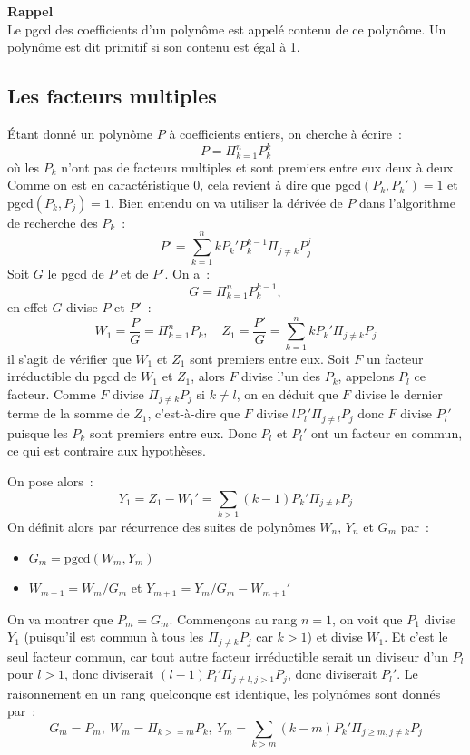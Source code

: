 \documentclass[a4paper,11pt]{article}
\begin{document}
\begin{giacjshere}
{\bf Rappel}\\
Le pgcd des coefficients d'un polynôme est appelé contenu de ce polynôme.
Un polynôme est dit primitif si son contenu est égal à 1.

\subsection{Les facteurs multiples}  
\'Etant donné un polynôme $P$ à coefficients entiers, on cherche à 
écrire~:
\[ P=\Pi_{k=1}^n P_k^k \]
où les $P_k$ n'ont pas de facteurs multiples et sont premiers entre
eux deux à deux. Comme on est en
caractéristique 0, cela revient à dire que pgcd$(P_k,P_k')=1$
et pgcd$(P_k,P_j)=1$. Bien entendu
on va utiliser la dérivée de $P$ dans l'algorithme de recherche des $P_k$~:
\[ P'=\sum_{k=1}^n kP_k' P_k^{k-1} \Pi_{j\neq k} P_j^j \]
Soit $G$ le pgcd de $P$ et de $P'$. On a~:
\[ G=\Pi_{k=1}^n P_k^{k-1}, \]
en effet $G$ divise $P$ et $P'$~:
\[ W_1=\frac{P}{G}=\Pi_{k=1}^n P_k, \quad 
Z_1=\frac{P'}{G}=\sum_{k=1}^n kP_k'\Pi_{j\neq k} P_j \]
il s'agit de vérifier que $W_1$ et $Z_1$ sont premiers entre eux. Soit $F$ un
facteur irréductible du pgcd de $W_1$ et $Z_1$, alors $F$ divise l'un des 
$P_k$,
appelons $P_l$ ce facteur. Comme $F$ divise $\Pi_{j\neq k} P_j$ si $k\neq l$,
on en déduit que $F$ divise le dernier terme de la somme de $Z_1$, c'est-à-dire
que $F$ divise $lP_l'\Pi_{j\neq l} P_j$ donc $F$ divise $P_l'$ puisque
les $P_k$ sont premiers entre eux. Donc $P_l$ et $P_l'$ ont un facteur
en commun, ce qui est contraire aux hypothèses.

On pose alors~:
\[ Y_1=Z_1-W_1'=\sum_{k>1} (k-1)P_k' \Pi_{j\neq k} P_j \]
On définit alors par récurrence des suites de polynômes $W_n$, $Y_n$ et
$G_m$ par~:
\begin{itemize}
\item $G_m=\mbox{pgcd}(W_m,Y_m)$
\item $W_{m+1}=W_m/G_m$ et $Y_{m+1}=Y_m/G_m-W_{m+1}'$
\end{itemize}
On va montrer que $P_m=G_m$. Commençons au rang $n=1$, on voit que $P_1$
divise $Y_1$ (puisqu'il est commun à tous les $\Pi_{j\neq k} P_j$ car
$k>1$) et divise $W_1$. Et c'est le seul facteur commun, car tout autre
facteur irréductible serait un diviseur d'un $P_l$ pour $l>1$, donc diviserait
$(l-1)P_l'\Pi_{j\neq l,j>1} P_j$, donc diviserait $P_l'$.
Le raisonnement en un rang quelconque est identique, les polynômes sont
donnés par~:
\[ G_m=P_m, \ W_{m}=\Pi_{k>=m} P_k, \ 
Y_{m}=\sum_{k>m} (k-m)P_k'\Pi_{j\geq m, j\neq k} P_j \]


\end{giacjshere}
\end{document}
